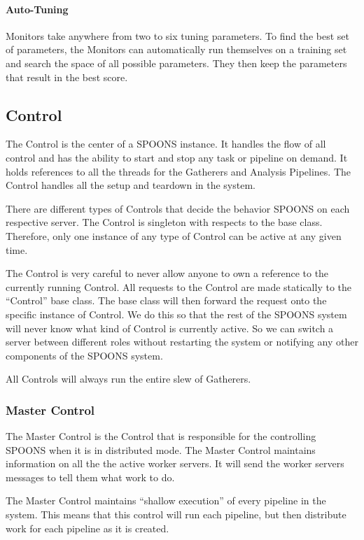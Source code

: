 \documentclass[12pt]{ucthesis}
\begin{document}
\paragraph{Auto-Tuning}
\label{arch-autotuning}
Monitors take anywhere from two to six tuning parameters. To find the best set of parameters, the Monitors can
automatically run themselves on a training set and search the space of all possible parameters. They then keep the
parameters that result in the best score.

\subsection{Control}
\label{arch-control}
The Control is the center of a SPOONS instance. It handles the flow of all control and has the ability to start and
stop any task or pipeline on demand. It holds references to all the threads for the Gatherers and Analysis Pipelines.
The Control handles all the setup and teardown in the system.

There are different types of Controls that decide the behavior SPOONS on each respective server.
The Control is singleton with respects to the base class. Therefore, only one instance of any type of Control can be
active at any given time.

The Control is very careful to never allow anyone to own a reference to the currently running Control.
All requests to the Control are made statically to the ``Control'' base class. The base class will then forward the
request onto the specific instance of Control. We do this so that the rest of the SPOONS system will never know
what kind of Control is currently active. So we can switch a server between different roles without restarting the
system or notifying any other components of the SPOONS system.

All Controls will always run the entire slew of Gatherers.

\subsubsection{Master Control}
\label{arch-master-control}
The Master Control is the Control that is responsible for the controlling SPOONS when it is in distributed mode.
The Master Control maintains information on all the the active worker servers. It will send the worker servers
messages to tell them what work to do.

The Master Control maintains ``shallow execution'' of every pipeline in the system.
This means that this control will run each pipeline, but then distribute work for each pipeline as it is created.
\end{document}
